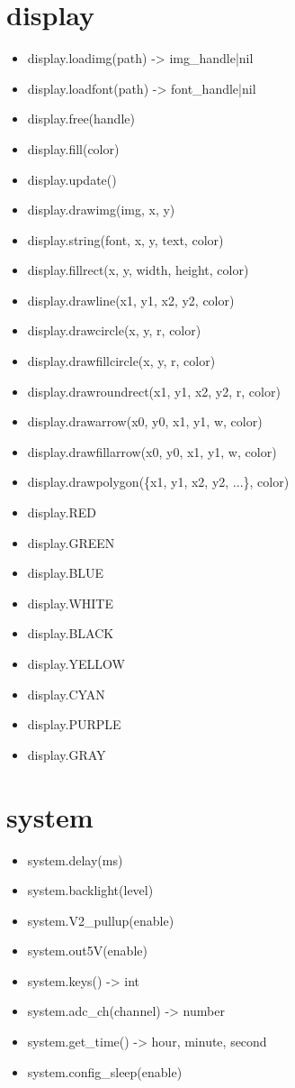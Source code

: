 \section{display}
\begin{itemize}
\item display.loadimg(path) -> img\_handle|nil
\item display.loadfont(path) -> font\_handle|nil
\item display.free(handle)
\item display.fill(color)
\item display.update()
\item display.drawimg(img, x, y)
\item display.string(font, x, y, text, color)
\item display.fillrect(x, y, width, height, color)
\item display.drawline(x1, y1, x2, y2, color)
\item display.drawcircle(x, y, r, color)
\item display.drawfillcircle(x, y, r, color)
\item display.drawroundrect(x1, y1, x2, y2, r, color)
\item display.drawarrow(x0, y0, x1, y1, w, color)
\item display.drawfillarrow(x0, y0, x1, y1, w, color)
\item display.drawpolygon(\{x1, y1, x2, y2, ...\}, color)
\item display.RED
\item display.GREEN
\item display.BLUE
\item display.WHITE
\item display.BLACK
\item display.YELLOW
\item display.CYAN
\item display.PURPLE
\item display.GRAY
\end{itemize}
\section{system}
\begin{itemize}
\item system.delay(ms)
\item system.backlight(level)
\item system.V2\_pullup(enable)
\item system.out5V(enable)
\item system.keys() -> int
\item system.adc\_ch(channel) -> number
\item system.get\_time() -> hour, minute, second
\item system.config\_sleep(enable)
\end{itemize}
